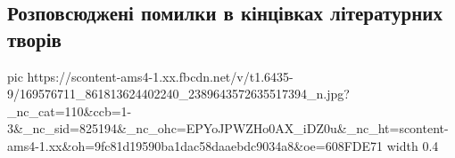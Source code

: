  
 
 
 
 

\subsection{Розповсюджені помилки в кінцівках літературних творів}
\label{sec:05_04_2021.fb.lenkivecka_ljudmila.1.literatura}


\ifcmt
  pic https://scontent-ams4-1.xx.fbcdn.net/v/t1.6435-9/169576711_861813624402240_2389643572635517394_n.jpg?_nc_cat=110&ccb=1-3&_nc_sid=825194&_nc_ohc=EPYoJPWZHo0AX_iDZ0u&_nc_ht=scontent-ams4-1.xx&oh=9fc81d19590ba1dac58daaebdc9034a8&oe=608FDE71
  width 0.4
\fi


